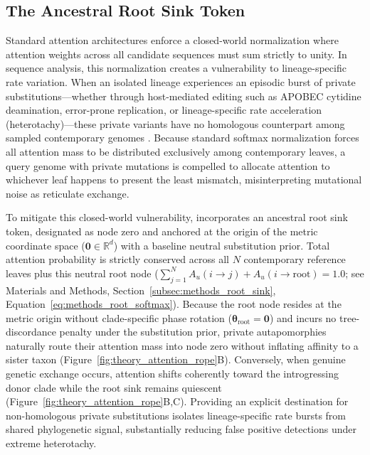 \subsection{The Ancestral Root Sink Token}
\label{subsec:root_sink}

Standard attention architectures enforce a closed-world normalization where attention weights across all candidate sequences must sum strictly to unity.
In sequence analysis, this normalization creates a vulnerability to lineage-specific rate variation.
When an isolated lineage experiences an episodic burst of private substitutions---whether through host-mediated editing such as APOBEC cytidine deamination, error-prone replication, or lineage-specific rate acceleration (heterotachy)---these private variants have no homologous counterpart among sampled contemporary genomes \citep{posada2001evaluation}.
Because standard softmax normalization forces all attention mass to be distributed exclusively among contemporary leaves, a query genome with private mutations is compelled to allocate attention to whichever leaf happens to present the least mismatch, misinterpreting mutational noise as reticulate exchange.

To mitigate this closed-world vulnerability, \RhizAeon incorporates an ancestral root sink token, designated as node zero and anchored at the origin of the metric coordinate space ($\mathbf{0} \in \mathbb{R}^d$) with a baseline neutral substitution prior.
Total attention probability is strictly conserved across all $N$ contemporary reference leaves plus this neutral root node ($\sum_{j=1}^N A_u(i \to j) + A_u(i \to \text{root}) = 1.0$; see Materials and Methods, Section~\ref{subsec:methods_root_sink}, Equation~\eqref{eq:methods_root_softmax}).
Because the root node resides at the metric origin without clade-specific phase rotation ($\bm{\theta}_{\text{root}} = \mathbf{0}$) and incurs no tree-discordance penalty under the substitution prior, private autapomorphies naturally route their attention mass into node zero without inflating affinity to a sister taxon (Figure~\ref{fig:theory_attention_rope}B).
Conversely, when genuine genetic exchange occurs, attention shifts coherently toward the introgressing donor clade while the root sink remains quiescent (Figure~\ref{fig:theory_attention_rope}B,C).
Providing an explicit destination for non-homologous private substitutions isolates lineage-specific rate bursts from shared phylogenetic signal, substantially reducing false positive detections under extreme heterotachy.


